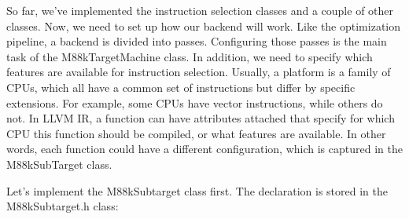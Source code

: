 
So far, we’ve implemented the instruction selection classes and a couple of other classes. Now, we need to set up how our backend will work. Like the optimization pipeline, a backend is divided into passes. Configuring those passes is the main task of the M88kTargetMachine class. In addition, we need to specify which features are available for instruction selection. Usually, a platform is a family of CPUs, which all have a common set of instructions but differ by specific extensions. For example, some CPUs have vector instructions, while others do not. In LLVM IR, a function can have attributes attached that specify for which CPU this function should be compiled, or what features are available. In other words, each function could have a different configuration, which is captured in the M88kSubTarget class.


Let’s implement the M88kSubtarget class first. The declaration is stored in the M88kSubtarget.h class:

